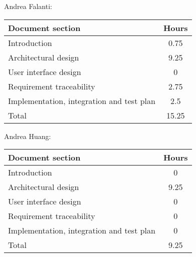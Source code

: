 Andrea Falanti:

\begin{tabular}{|l|c|}
    \hline
    Document section & Hours \\
    \hline
     Introduction & 0.75\\
     Architectural design & 9.25\\
     User interface design & 0\\
     Requirement traceability & 2.75\\
     Implementation, integration and test plan & 2.5\\
     \hline
     Total & 15.25\\
     \hline
\end{tabular}
\vskip 0.3in

Andrea Huang:

\begin{tabular}{|l|c|}
    \hline
    Document section & Hours \\
    \hline
     Introduction & 0\\
     Architectural design & 9.25\\
     User interface design & 0\\
     Requirement traceability & 0\\
     Implementation, integration and test plan & 0\\
     \hline
     Total & 9.25\\
     \hline
\end{tabular}